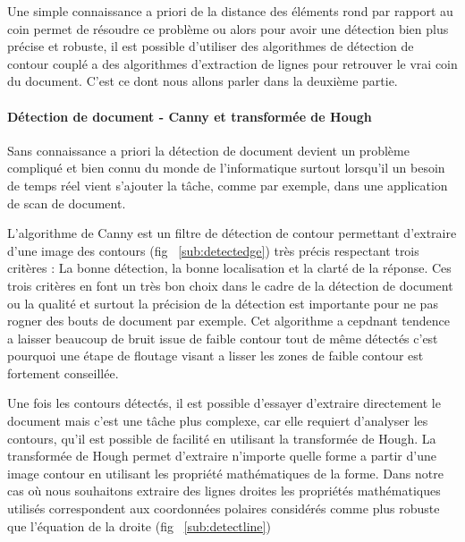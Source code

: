Une simple connaissance a priori de la distance des éléments rond par rapport au coin permet de résoudre ce problème ou alors pour avoir une détection bien plus précise et robuste, il est possible d'utiliser des algorithmes de détection de contour couplé a des algorithmes d'extraction de lignes pour retrouver le vrai coin du document. C'est ce dont nous allons parler dans la deuxième partie.

\paragraph{Détection de document - Canny et transformée de Hough} Sans connaissance a priori la détection de document devient un problème compliqué et bien connu du monde de l'informatique surtout lorsqu'il un besoin de temps réel vient s'ajouter la tâche, comme par exemple, dans une application de scan de document.

L'algorithme de Canny\cite{Canny86acomputational} est un filtre de détection de contour permettant d'extraire d'une image des contours (fig ~\ref{sub:detectedge}) très précis respectant trois critères : La bonne détection, la bonne localisation et la clarté de la réponse. Ces trois critères en font un très bon choix dans le cadre de la détection de document ou la qualité et surtout la précision de la détection est importante pour ne pas rogner des bouts de document par exemple. Cet algorithme a cepdnant tendence a laisser beaucoup de bruit issue de faible contour tout de même détectés c'est pourquoi une étape de floutage visant a lisser les zones de faible contour est fortement conseillée.

Une fois les contours détectés, il est possible d'essayer d'extraire directement le document mais c'est une tâche plus complexe, car elle requiert d'analyser les contours, qu'il est possible de facilité en utilisant la transformée de Hough\cite{hough}. La transformée de Hough permet d'extraire n'importe quelle forme a partir d'une image contour en utilisant les propriété mathématiques de la forme. Dans notre cas où nous souhaitons extraire des lignes droites les propriétés mathématiques utilisés correspondent aux coordonnées polaires considérés comme plus robuste que l’équation de la droite (fig ~\ref{sub:detectline})

